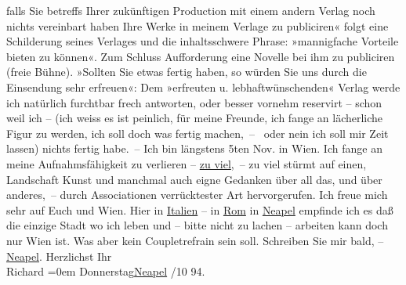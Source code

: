 \begin{ledgroupsized}[t]{13cm}
                  {\pb}falls Sie betreffs Ihrer
               zukünftigen Production mit einem andern Verlag noch nichts vereinbart haben Ihre
               Werke in meinem Verlage zu publiciren« folgt eine Schilderung seines Verlages und die
               inhaltsschwere Phrase: »mannigfache Vorteile bieten zu können«. Zum Schluss
               Aufforderung eine Novelle bei ihm zu publiciren (freie
                  Bühne). »Sollten Sie {\pb}etwas
               fertig haben, so würden Sie uns durch die Einsendung sehr erfreuen«: Dem »erfreuten
               u. lebhaftwünschenden« Verlag werde ich natürlich furchtbar frech antworten, oder
               besser vornehm reservirt – schon weil ich – (ich weiss es ist peinlich, für meine
               Freunde, ich fange an lächerliche Figur zu werden, ich soll doch was fer{\pb}tig machen, –  oder nein ich soll
               mir Zeit lassen) nichts fertig habe. –\pend
           \pstart
           Ich bin längstens 5ten Nov. in Wien. Ich
               fange an meine Aufnahmsfähigkeit zu verlieren – \uline{zu
                  viel}, – zu viel stürmt auf einen, Landschaft Kunst und manchmal {\pb}auch eigne Gedanken über all das,
               und über anderes, – durch Associationen verrücktester Art hervorgerufen.\pend
           \pstart
           Ich freue mich sehr auf Euch und Wien. Hier in \uline{Italien} – in \uline{Rom} in \uline{Neapel} empfinde ich es daß die einzige Stadt wo ich leben {\pb}und – bitte nicht zu lachen –
               arbeiten kann doch nur Wien ist. Was aber kein
               Coupletrefrain sein soll. Schreiben Sie mir bald, – \uline{Neapel}.\pend
           \pstart
           Herzlichst Ihr{\\[\baselineskip]}\spacefill\mbox{Richard}\pend
           \leftskip=0em{}\pstart
           Donnerstag\hspace*{1.5em}\uline{Neapel}\pend
           /10 94.\pend
           
         
         \endnumbering{}\end{ledgroupsized}  \newcommand{\dateiname}{L00384}\newcommand{\titel}{Richard Beer-Hofmann an Arthur Schnitzler, 18. 10. 1894}\newcommand{\editorInnen}{Martin Anton Müller und Gerd-Hermann Susen}
      